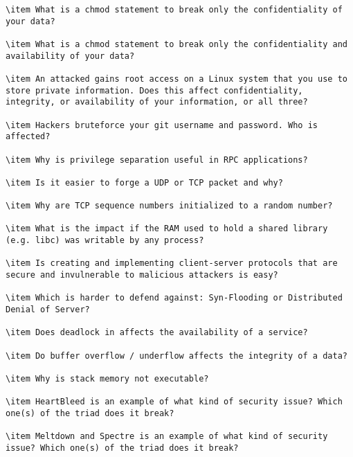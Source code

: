 \begin{lstlisting}
\item What is a chmod statement to break only the confidentiality of your data?

\item What is a chmod statement to break only the confidentiality and availability of your data?

\item An attacked gains root access on a Linux system that you use to store private information. Does this affect confidentiality, integrity, or availability of your information, or all three?

\item Hackers bruteforce your git username and password. Who is affected?

\item Why is privilege separation useful in RPC applications?

\item Is it easier to forge a UDP or TCP packet and why? 

\item Why are TCP sequence numbers initialized to a random number?

\item What is the impact if the RAM used to hold a shared library (e.g. libc) was writable by any process?

\item Is creating and implementing client-server protocols that are secure and invulnerable to malicious attackers is easy?

\item Which is harder to defend against: Syn-Flooding or Distributed Denial of Server?

\item Does deadlock in affects the availability of a service?

\item Do buffer overflow / underflow affects the integrity of a data?

\item Why is stack memory not executable? 

\item HeartBleed is an example of what kind of security issue? Which one(s) of the triad does it break?

\item Meltdown and Spectre is an example of what kind of security issue? Which one(s) of the triad does it break?

\end{lstlisting}



